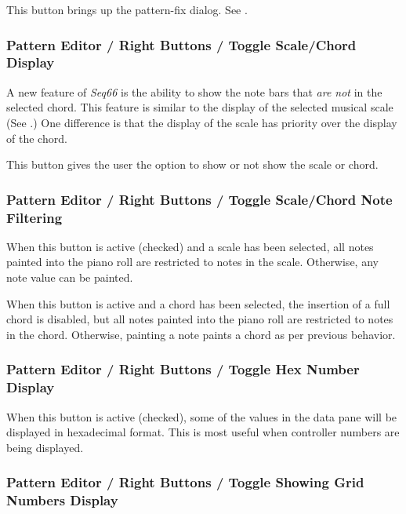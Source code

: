    This button brings up the pattern-fix dialog.
   See .

\subsubsection{Pattern Editor / Right Buttons / Toggle Scale/Chord Display}
\label{subsubsec:pattern_editor_right_buttons_scale_chord_display}

   A new feature of \textsl{Seq66} is the ability to show the note bars
   that \textsl{are not} in the selected chord.
   This feature is similar to the display of the selected musical scale
   (See .)
   One difference is that the display of the scale has priority over the
   display of the chord.

   This button gives the user the option to show or not show the scale or
   chord.

\subsubsection{Pattern Editor / Right Buttons / Toggle Scale/Chord Note Filtering}
\label{subsubsec:pattern_editor_right_buttons_scale_chord_filtering}

   When this button is active (checked) and a scale has been selected,
   all notes painted into the piano roll are restricted to notes
   in the scale.
   Otherwise, any note value can be painted.

   When this button is active and a chord has been selected,
   the insertion of a full chord is disabled, but
   all notes painted into the piano roll are restricted to notes
   in the chord.
   Otherwise, painting a note paints a chord as per previous behavior.

\subsubsection{Pattern Editor / Right Buttons / Toggle Hex Number Display}
\label{subsubsec:pattern_editor_left_buttons_hex_number_display}

   When this button is active (checked), some of the values in the
   data pane will be displayed in hexadecimal format.
   This is most useful when controller numbers are being displayed.

\subsubsection{Pattern Editor / Right Buttons / Toggle Showing Grid Numbers Display}
\label{subsubsec:pattern_editor_left_buttons_grid_numbers}


